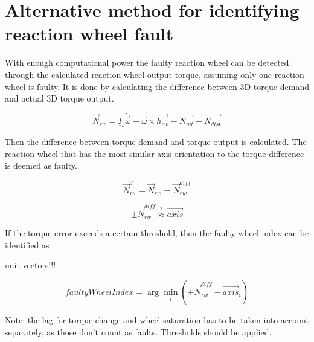 \chapter{Alternative method for identifying reaction wheel fault}

With enough computational power the faulty reaction wheel can be detected through the calculated reaction wheel output torque, assuming only one reaction wheel is faulty. It is done by calculating the difference between 3D torque demand and actual 3D torque output. 

\begin{equation}
\vec{N}_{rw} = \underline{I}_s \dot{\vec{\omega}}  + \vec{\omega} \times \vec{h_{rw}} - \vec{N_{mt}} - \vec{N_{dist}}
\end{equation}

Then the difference between torque demand and torque output is calculated. The reaction wheel that has the most similar axis orientation to the torque difference is deemed as faulty.

\begin{equation}
\vec{N}_{rw}^{d} - \vec{N}_{rw} = 
\vec{N}_{rw}^{diff}
\end{equation}

\begin{equation}
 \pm \vec{N}_{rw}^{diff}  \stackrel{?}{\approx} \vec{axis} 
\end{equation}

If the torque error exceeds a certain threshold, then the faulty wheel index can be identified as

unit vectors!!!

\begin{equation}
faultyWheelIndex = \arg\min_i ( \pm \vec{N}_{rw}^{diff} - \vec{axis}_i ) 
\end{equation}


Note: the lag for torque change and wheel saturation has to be taken into account separately, as those don't count as faults. 
Thresholds should be applied.